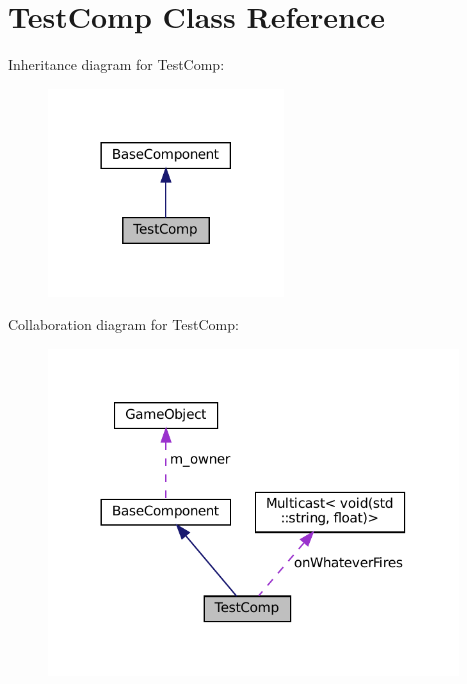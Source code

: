 \hypertarget{classTestComp}{}\section{Test\+Comp Class Reference}
\label{classTestComp}


Inheritance diagram for Test\+Comp\+:
\nopagebreak
\begin{figure}[H]
\begin{center}
\leavevmode
\includegraphics[width=177pt]{classTestComp__inherit__graph}
\end{center}
\end{figure}


Collaboration diagram for Test\+Comp\+:
\nopagebreak
\begin{figure}[H]
\begin{center}
\leavevmode
\includegraphics[width=308pt]{classTestComp__coll__graph}
\end{center}
\end{figure}
